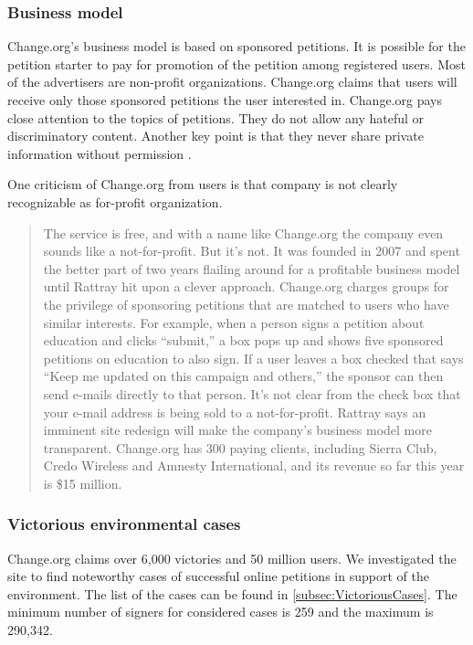 \subsubsection{Business model}
Change.org's business model is based on sponsored petitions. It is possible for the petition starter to pay for promotion of the petition among registered users. Most of the advertisers are non-profit organizations. Change.org claims that users will receive only those sponsored petitions the user interested in. Change.org pays close attention to the topics of petitions. They do not allow any hateful or discriminatory content. Another key point is that they never share private information without permission \citep{Change16}.\par\vspace{0.2cm}
One criticism of Change.org from users is that company is not clearly recognizable as for-profit organization.
\begin{quote}
The service is free, and with a name like Change.org the company even sounds like a not-for-profit. But it’s not. It was founded in 2007 and spent the better part of two years flailing around for a profitable business model until Rattray hit upon a clever approach. Change.org charges groups for the privilege of sponsoring petitions that are matched to users who have similar interests. For example, when a person signs a petition about education and clicks “submit,” a box pops up and shows five sponsored petitions on education to also sign. If a user leaves a box checked that says “Keep me updated on this campaign and others,” the sponsor can then send e-mails directly to that person. It’s not clear from the check box that your e-mail address is being sold to a not-for-profit. Rattray says an imminent site redesign will make the company’s business model more transparent. Change.org has 300 paying clients, including Sierra Club, Credo Wireless and Amnesty International, and its revenue so far this year is \$15 million.
\citep{Geron2012}
\end{quote}

\subsubsection{Victorious environmental cases}
Change.org claims over 6,000 victories and 50 million users. We investigated the site to find noteworthy cases of successful online petitions in support of the environment. The list of the cases can be found in \ref{subsec:VictoriousCases}. The minimum number of signers for considered cases is 259 and the maximum is 290,342. 

